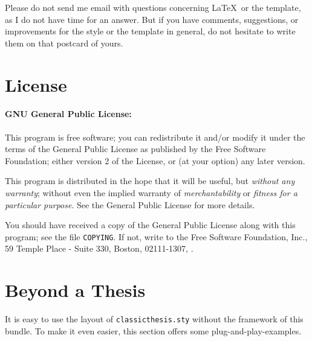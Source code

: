 Please do not send me email with questions concerning \LaTeX\ or the
template, as I do not have time for an answer. But if you have
comments, suggestions, or improvements for the style or the template
in general, do not hesitate to write them on that postcard of yours.


\section{License}
\paragraph{GNU General Public License:} This program is free software;
you can redistribute it and/or modify
 it under the terms of the  General Public License as
 published by
 the Free Software Foundation; either version 2 of the License, or
 (at your option) any later version.

 This program is distributed in the hope that it will be useful,
 but \emph{without any warranty}; without even the implied warranty of
 \emph{merchantability} or \emph{fitness for a particular purpose}.
 See the
  General Public License for more details.

 You should have received a copy of the  General
 Public License
 along with this program; see the file \texttt{COPYING}.  If not,
 write to
 the Free Software Foundation, Inc., 59 Temple Place - Suite 330,
 Boston,  02111-1307, .


\section{Beyond a Thesis}
It is easy to use the layout of \texttt{classicthesis.sty} without the
framework of this bundle. To make it even easier, this section offers 
some plug-and-play-examples.





